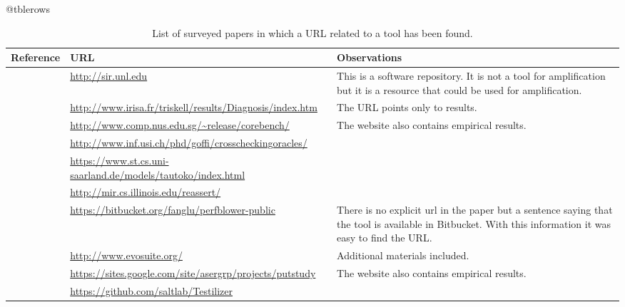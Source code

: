 \expandafter\let\csname c@tblerows\endcsname\rownum

\begin{table}[!h]
    \caption{List of surveyed papers in which a URL related to a tool has been found.}
    \label{tab:table:tools:urls}
    \centering
    \small
    \begin{tabularx}{\textwidth}{lXX}
	    \toprule
	    Reference & URL & Observations \\
	    \midrule
	    \cite{SIR}                                & \url{http://sir.unl.edu}                                          & This is a software repository. It is not a tool for amplification but it is a resource that could be used for amplification.\\
	    \cite{Baudry:2006:ITS:1134285.1134299}    & \url{http://www.irisa.fr/triskell/results/Diagnosis/index.htm}    & The URL points only to results. \\
	    \cite{bohme2014corebench}                 & \url{http://www.comp.nus.edu.sg/~release/corebench/}              & The website also contains empirical results.\\
	    \cite{Carzaniga:2014:COI:2568225.2568287} & \url{http://www.inf.usi.ch/phd/goffi/crosscheckingoracles/}       & \\
	    \cite{Dallmeier2010}                      & \url{https://www.st.cs.uni-saarland.de/models/tautoko/index.html} & \\
	    \cite{reassert2009}                       & \url{http://mir.cs.illinois.edu/reassert/}                        & \\
	    \cite{fang2015perfblower}                 & \url{https://bitbucket.org/fanglu/perfblower-public}              & There is no explicit url in the paper but a sentence saying that the tool is available in Bitbucket. With this information it was easy to find the URL. \\
	    \cite{fraser2011evosuite}                 & \url{http://www.evosuite.org/}                                    & Additional materials included. \\
	    \cite{marri2010retrofitting}              & \url{https://sites.google.com/site/asergrp/projects/putstudy}     & The website also contains empirical results.\\
	    \cite{milani2014}                         & \url{https://github.com/saltlab/Testilizer}                       & \\

\end{tabularx}
\end{table}
